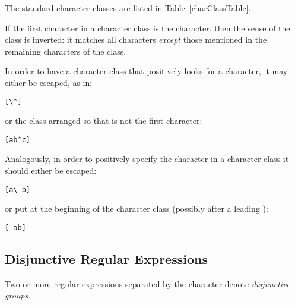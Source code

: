 The standard character classes are listed in Table~\vref{charClassTable}.

\begin{table}[htbp]
\end{table}
If the first character in a character class is the \q{\uphat} character, then the sense of the class is inverted: it matches all characters \emph{except} those mentioned in the remaining characters of the class.
\begin{aside}
In order to have a character class that positively looks for a \q{\uphat} character, it may either be escaped, as in:
\begin{lstlisting}
[\^]
\end{lstlisting}
or the class arranged so that \q{\uphat} is not the first character:
\begin{lstlisting}
[ab^c]
\end{lstlisting}

Analogously, in order to positively specify the \q{-} character in a character class it should either be escaped:
\begin{lstlisting}
[a\-b]
\end{lstlisting}
or put at the beginning of the character class (possibly after a leading \q{\uphat}):
\begin{lstlisting}
[-ab]
\end{lstlisting}
\end{aside}

\subsection{Disjunctive Regular Expressions}
\label{disjunctiveRegexp}
Two or more regular expressions separated by the \q{|} character denote \emph{disjunctive groups}. 

